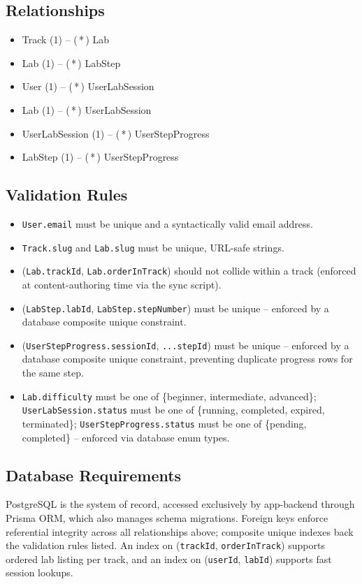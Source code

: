 \documentclass[11pt]{article}
\begin{document}
\subsection{Relationships}
\begin{itemize}
\item Track (1) -- (\,*\,) Lab
\item Lab (1) -- (\,*\,) LabStep
\item User (1) -- (\,*\,) UserLabSession
\item Lab (1) -- (\,*\,) UserLabSession
\item UserLabSession (1) -- (\,*\,) UserStepProgress
\item LabStep (1) -- (\,*\,) UserStepProgress
\end{itemize}

\subsection{Validation Rules}
\begin{itemize}
\item \texttt{User.email} must be unique and a syntactically valid
      email address.
\item \texttt{Track.slug} and \texttt{Lab.slug} must be unique,
      URL-safe strings.
\item (\texttt{Lab.trackId}, \texttt{Lab.orderInTrack}) should not
      collide within a track (enforced at content-authoring time via
      the sync script).
\item (\texttt{LabStep.labId}, \texttt{LabStep.stepNumber}) must be
      unique -- enforced by a database composite unique constraint.
\item (\texttt{UserStepProgress.sessionId}, \texttt{...stepId}) must
      be unique -- enforced by a database composite unique constraint,
      preventing duplicate progress rows for the same step.
\item \texttt{Lab.difficulty} must be one of \{beginner,
      intermediate, advanced\}; \texttt{UserLabSession.status} must be
      one of \{running, completed, expired, terminated\};
      \texttt{UserStepProgress.status} must be one of \{pending,
      completed\} -- enforced via database enum types.
\end{itemize}

\subsection{Database Requirements}
PostgreSQL is the system of record, accessed exclusively by
app-backend through Prisma ORM, which also manages schema migrations.
Foreign keys enforce referential integrity across all relationships
above; composite unique indexes back the validation rules listed. An
index on (\texttt{trackId}, \texttt{orderInTrack}) supports ordered
lab listing per track, and an index on (\texttt{userId},
\texttt{labId}) supports fast session lookups.
\end{document}
